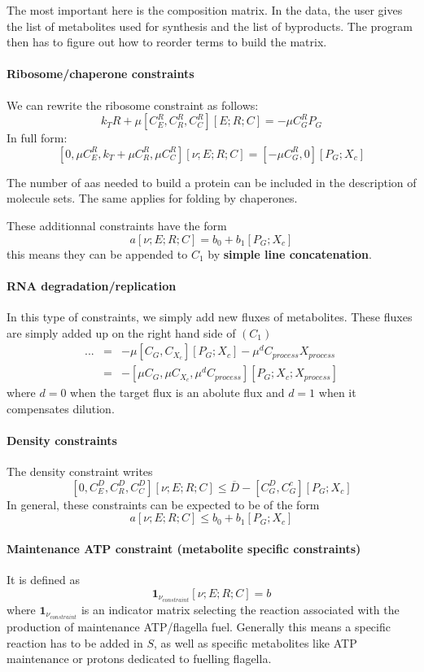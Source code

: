 The most important here is the composition matrix. In the data, the user gives the list of metabolites used for synthesis and the list of byproducts. The program then has to figure out how to reorder terms to build the matrix.

\paragraph{Ribosome/chaperone constraints} We can rewrite the ribosome constraint as follows:
\[
k_TR + \mu [C^R_E,C^R_R,C^R_C] [E;R;C] = -\mu C^R_GP_G
\]
In full form:
\[
[0,\mu C^R_E,k_T+\mu C^R_R,\mu C^R_C] [\nu;E;R;C] = [-\mu C^R_G,0][P_G;X_c]
\]

The number of aas needed to build a protein can be included in the description of molecule sets. The same applies for folding by chaperones. 

These additionnal constraints have the form
\[
a [\nu; E; R; C] = b_0 + b_1 [P_G;X_c]
\]
this means they can be appended to $C_1$ by \textbf{simple line concatenation}.

\paragraph{RNA degradation/replication} In this type of constraints, we simply add new fluxes of metabolites. These fluxes are simply added up on the right hand side of $(C_1)$
\[
\begin{array}{rcl}
...  & = & -\mu[C_G,C_{X_c}][P_G;X_c] - \mu^{d}C_{process}X_{process} \\
 & =  & -[\mu C_G, \mu C_{X_c},\mu^d C_{process}][P_G;X_c;X_{process}]
\end{array}
\]
where $d = 0$ when the target flux is an abolute flux and $d=1$ when it compensates dilution.

\paragraph{Density constraints} The density constraint writes
\[
[0,C^D_E,C^D_R,C^D_C] [\nu;E;R;C] \leq \overline{D} - [C^D_G,C^c_G][P_G;X_c]
\]
In general, these constraints can be expected to be of the form
\[
a [\nu; E; R; C] \leq b_0 + b_1 [P_G;X_c]
\]

\paragraph{Maintenance ATP constraint (metabolite specific constraints)} It is defined as
\[
\mathbf{1}_{\nu_{constraint}} [\nu; E; R; C] = b
\]
where $\mathbf{1}_{\nu_{constraint}}$ is an indicator matrix selecting the reaction associated with the production of maintenance ATP/flagella fuel. Generally this means a specific reaction has to be added in $S$, as well as specific metabolites like ATP maintenance or protons dedicated to fuelling flagella.

